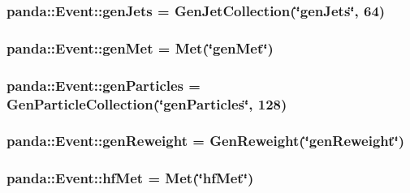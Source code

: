 \label{classpanda_1_1Event_ae032ee07dd410e6ce3579e7e530c65f7}
\hypertarget{classpanda_1_1Event_ae3a54af82a3cdb9e752c4b94cbf5fb48}{
\subsubsection[{genJets}]{ {\bf panda::Event::genJets} = {\bf GenJetCollection}(\char`\"{}genJets\char`\"{}, 64)}}
\label{classpanda_1_1Event_ae3a54af82a3cdb9e752c4b94cbf5fb48}
\hypertarget{classpanda_1_1Event_a2a2b92638c18227eac196b49b45f93dd}{
\subsubsection[{genMet}]{ {\bf panda::Event::genMet} = {\bf Met}(\char`\"{}genMet\char`\"{})}}
\label{classpanda_1_1Event_a2a2b92638c18227eac196b49b45f93dd}
\hypertarget{classpanda_1_1Event_ab586e3c06b59b23f2d2869a7e5d28648}{
\subsubsection[{genParticles}]{ {\bf panda::Event::genParticles} = {\bf GenParticleCollection}(\char`\"{}genParticles\char`\"{}, 128)}}
\label{classpanda_1_1Event_ab586e3c06b59b23f2d2869a7e5d28648}
\hypertarget{classpanda_1_1Event_a30a3ce250e37a21cf8d280a728f45a9c}{
\subsubsection[{genReweight}]{ {\bf panda::Event::genReweight} = {\bf GenReweight}(\char`\"{}genReweight\char`\"{})}}
\label{classpanda_1_1Event_a30a3ce250e37a21cf8d280a728f45a9c}
\hypertarget{classpanda_1_1Event_acc4184933eb9ecfa7e7f9bcd2d8fff1a}{
\subsubsection[{hfMet}]{ {\bf panda::Event::hfMet} = {\bf Met}(\char`\"{}hfMet\char`\"{})}}
